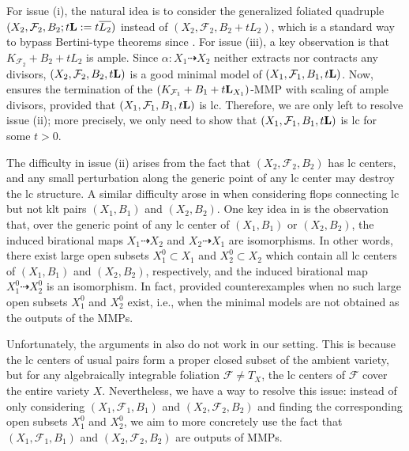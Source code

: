 \documentclass[11pt]{amsart}
\numberwithin{equation}{section}
\newcommand{\Ff}{\mathcal{F}}
\newcommand{\Ll}{{\bf{L}}}
\theoremstyle{definition}
\theoremstyle{definition}
\theoremstyle{definition}
\begin{document}
For issue (i), the natural idea is to consider the generalized foliated quadruple $(X_2,\Ff_2,B_2;t\Ll:=t\overline{L_2})$ instead of $(X_2,\Ff_2,B_2+tL_2)$, which is a standard way to bypass Bertini-type theorems since \cite{LLM23}. For issue (iii), a key observation is that $K_{\Ff_2}+B_2+tL_2$ is ample. Since $\alpha: X_1\dashrightarrow X_2$ neither extracts nor contracts any divisors, $(X_2,\Ff_2,B_2,t\Ll)$ is a good minimal model of $(X_1,\Ff_1,B_1,t\Ll)$. Now, \cite[Theorem 1.11]{LMX24b} ensures the termination of the $(K_{\Ff_1}+B_1+t\Ll_{X_1})$-MMP with scaling of ample divisors, provided that $(X_1,\Ff_1,B_1,t\Ll)$ is lc. Therefore, we are only left to resolve issue (ii); more precisely, we only need to show that $(X_1,\Ff_1,B_1,t\Ll)$ is lc for some $t>0$.


The difficulty in issue (ii) arises from the fact that $(X_2,\Ff_2,B_2)$ has lc centers, and any small perturbation along the generic point of any lc center may destroy the lc structure. A similar difficulty arose in \cite{Has20} when considering flops connecting lc but not klt pairs $(X_1,B_1)$ and $(X_2,B_2)$. One key idea in \cite[Proof of Theorem 1.1]{Has20} is the observation that, over the generic point of any lc center of $(X_1,B_1)$ or $(X_2,B_2)$, the induced birational maps $X_1\dashrightarrow X_2$ and $X_2\dashrightarrow X_1$ are isomorphisms. In other words, there exist large open subsets $X^0_1\subset X_1$ and $X^0_2\subset X_2$ which contain all lc centers of $(X_1,B_1)$ and $(X_2,B_2)$, respectively, and the induced birational map $X^0_1\dashrightarrow X^0_2$ is an isomorphism. In fact, \cite[Section 4]{Has20} provided counterexamples when no such large open subsets $X^0_1$ and $X^0_2$ exist, i.e., when the minimal models are not obtained as the outputs of the MMPs.

Unfortunately, the arguments in \cite[Proof of Theorem 1.1]{Has20} also do not work in our setting. This is because the lc centers of usual pairs form a proper closed subset of the ambient variety, but for any algebraically integrable foliation $\Ff\neq T_X$, the lc centers of $\Ff$ cover the entire variety $X$. Nevertheless, we have a way to resolve this issue: instead of only considering $(X_1,\Ff_1,B_1)$ and $(X_2,\Ff_2,B_2)$ and finding the corresponding open subsets $X^0_1$ and $X^0_2$, we aim to more concretely use the fact that $(X_1,\Ff_1,B_1)$ and $(X_2,\Ff_2,B_2)$ are outputs of MMPs.
\end{document}
